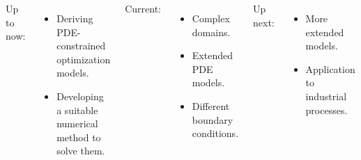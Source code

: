 \documentclass[aspectratio=169,xcolor=dvipsnames]{beamer}
\begin{document}
\begin{frame}
\begin{columns}
		
	Up to now:
	\begin{itemize}
		\item Deriving PDE-constrained optimization models.
		\item Developing a suitable numerical method to solve them.
	\end{itemize}
	Current:
	\begin{itemize}
		\item Complex domains.
		\item Extended PDE models.
		\item Different boundary conditions.
	\end{itemize}
	Up next:
	\begin{itemize}
		\item More extended models.
		\item Application to industrial processes.
	\end{itemize}
	\vspace{-0.6cm}
	\begin{figure}
		\includegraphics[width=2.7cm]{west.png}\\
		\includegraphics[width=3cm]{beer.png}\\
		\includegraphics[width=3cm]{ufraction8.png}\\
		\includegraphics[width=3cm]{Microfilter.png}
	\end{figure}
	\end{columns}
\end{frame}

\appendix
\end{document}
